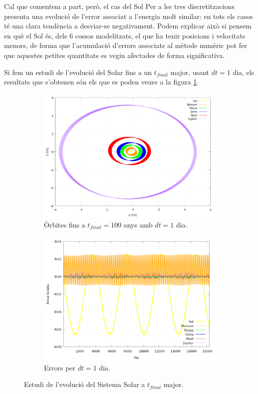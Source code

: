 \documentclass[10pt, twoside, a4paper]{article}
\begin{document}
Cal que comentem a part, però, el cas del Sol Per a les tres discretitzacions presenta una evolució de l'error associat a l'energia molt similar: en tots els casos té una clara tendència a desviar-se negativament. Podem explicar això si pensem en què el Sol és, dels 6 cossos modelitzats, el que ha tenir posicions i velocitats menors, de forma que l'acumulació d'errors associats al mètode numèric pot fer que aquestes petites quantitats es vegin afectades de forma significativa.

Si fem un estudi de l'evolució del Solar fins a un $t_{final}$ major, usant $dt=1$ dia, els resultats que s'obtenen són els que es poden veure a la figura \ref{fig4}.

\begin{figure}[h!]
    \centering
    \begin{subfigure}[b]{0.48\linewidth}
        \centering
        \includegraphics[width=\linewidth]{../sist_solar/orbites_euler_100_d1dia.png}
        \caption{Òrbites fins a $t_{final}=100$ anys amb $dt=1$ dia.}
    \end{subfigure}
    \hfill
    \begin{subfigure}[b]{0.48\linewidth}
        \centering
        \includegraphics[width=\linewidth]{../Error/error_100_dia.png}
        \caption{Errors per $dt=1$ dia.}
    \end{subfigure}
    \caption{Estudi de l'evolució del Sistema Solar a $t_{final}$ major.}
    \label{fig4}
\end{figure}
\end{document}

